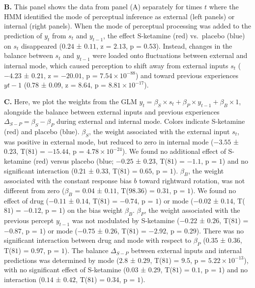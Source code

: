 \documentclass[
]{article}
\begin{document}
\textbf{B.} This panel shows the data from panel (A) separately for
times \(t\) where the HMM identified the mode of perceptual inference as
external (left panels) or internal (right panels). When the mode of
perceptual processing was added to the prediction of \(y_t\) from
\(s_t\) and \(y_{t-1}\), the effect S-ketamine (red) vs.~placebo (blue)
on \(s_t\) disappeared (\(0.24\) ± \(0.11\), z = \(2.13\), p =
\(0.53\)). Instead, changes in the balance between \(s_t\) and
\(y_{t-1}\) were loaded onto fluctuations between external and internal
mode, which caused perception to shift away from external inputs \(s_t\)
(\(-4.23\) ± \(0.21\), z = \(-20.01\), p =
\(\ensuremath{7.54\times 10^{-88}}\)) and toward previous experiences
\(y{t-1}\) (\(0.78\) ± \(0.09\), z = \(8.64\), p =
\(\ensuremath{8.81\times 10^{-17}}\)).

\textbf{C.} Here, we plot the weights from the GLM
\(y_t = \beta_S \times s_t + \beta_P \times y_{t-1} + \beta_B \times 1\),
alongside the balance between external inputs and previous experiences
\(\Delta_{S-P} = \beta_S - \beta_P\) during external and internal mode.
Colors indicate S-ketamine (red) and placebo (blue). \(\beta_S\), the
weight associated with the external input \(s_t\), was positive in
external mode, but reduced to zero in internal mode (\(-3.55\) ±
\(0.23\), T(\(81\)) = \(-15.44\), p =
\(\ensuremath{4.78\times 10^{-24}}\)). We found no additional effect of
S-ketamine (red) versus placebo (blue; \(-0.25\) ± \(0.23\), T(\(81\)) =
\(-1.1\), p = \(1\)) and no significant interaction (\(0.21\) ±
\(0.33\), T(\(81\)) = \(0.65\), p = \(1\)). \(\beta_B\), the weight
associated with the constant response bias \(b\) toward rightward
rotation, was not different from zero (\(\beta_B\) = \(0.04\) ±
\(0.11\), T(\(98.36\)) = \(0.31\), p = \(1\)). We found no effect of
drug (\(-0.11\) ± \(0.14\), T(\(81\)) = \(-0.74\), p = \(1\)) or mode
(\(-0.02\) ± \(0.14\), T(\(81\)) = \(-0.12\), p = \(1\)) on the bias
weight \(\beta_B\). \(\beta_P\), the weight associated with the previous
percept \(y_{t-1}\) was not modulated by S-ketamine (\(-0.22\) ±
\(0.26\), T(\(81\)) = \(-0.87\), p = \(1\)) or mode (\(-0.75\) ±
\(0.26\), T(\(81\)) = \(-2.92\), p = \(0.29\)). There was no significant
interaction between drug and mode with respect to \(\beta_P\) (\(0.35\)
± \(0.36\), T(\(81\)) = \(0.97\), p = \(1\)). The balance
\(\Delta_{S-P}\) between external inputs and internal predictions was
determined by mode (\(2.8\) ± \(0.29\), T(\(81\)) = \(9.5\), p =
\(\ensuremath{5.22\times 10^{-13}}\)), with no significant effect of
S-ketamine (\(0.03\) ± \(0.29\), T(\(81\)) = \(0.1\), p = \(1\)) and no
interaction (\(0.14\) ± \(0.42\), T(\(81\)) = \(0.34\), p = \(1\)).
\end{document}
